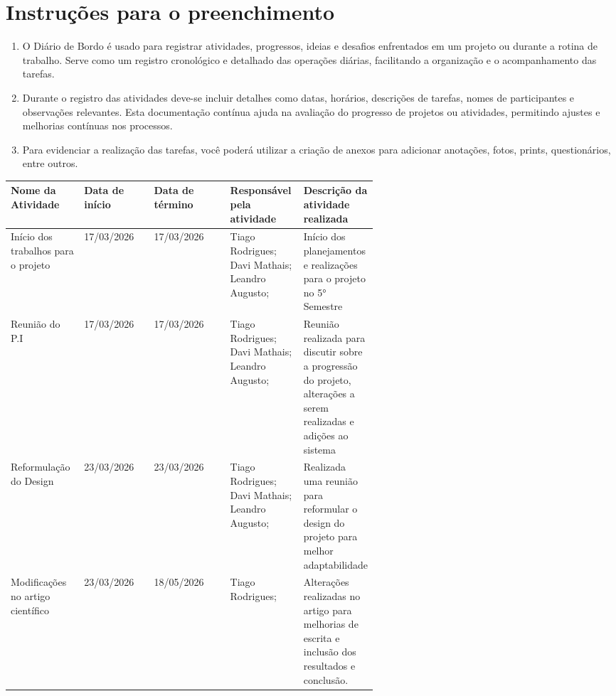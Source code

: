 \documentclass[
landscape,
  a4paper,
  12pt,
  english,
  brazilian,
]{article}
\begin{document}
\section*{Instruções para o preenchimento}
\doublespacing
\begin{enumerate}
    \item O Diário de Bordo é usado para registrar atividades, progressos, ideias e desafios enfrentados em um projeto ou durante a rotina de trabalho. Serve como um registro cronológico e detalhado das operações diárias, facilitando a organização e o acompanhamento das tarefas.
    \doublespacing
    \item Durante o registro das atividades deve-se incluir detalhes como datas, horários, descrições de tarefas, nomes de participantes e observações relevantes.  Esta documentação contínua ajuda na avaliação do progresso de projetos ou atividades, permitindo ajustes e melhorias contínuas nos processos.
    \doublespacing
    \item Para evidenciar a realização das tarefas, você poderá utilizar a criação de anexos para adicionar anotações, fotos, prints, questionários, entre outros.
\end{enumerate}

 \begin{table}[]
\centering
 

\begin{tabular}{|>{\raggedright\arraybackslash}p{0.2\linewidth}|l|l|>{\raggedright\arraybackslash}p{0.2\linewidth}|>{\raggedright\arraybackslash}p{0.2\linewidth}|}
\hline
Nome da Atividade & Data de início & Data de término & Responsável pela atividade & Descrição da atividade realizada \\\hline
                  Início dos trabalhos para o projeto&                            17/03/2026&                17/03/2026&                  Tiago Rodrigues; Davi Mathais; Leandro Augusto;&                                  Início dos planejamentos e realizações para o projeto no 5° Semestre\\ \hline
                  Reunião do P.I&                            17/03/2026&                17/03/2026&                 Tiago Rodrigues; Davi Mathais; Leandro Augusto;&                                 Reunião realizada para discutir sobre a progressão do projeto, alterações a serem realizadas e adições ao sistema \\ \hline 
 Reformulação do Design&                            23/03/2026&                 23/03/2026&                 Tiago Rodrigues; Davi Mathais; Leandro Augusto;&                                 Realizada uma reunião para reformular o design do projeto para melhor adaptabilidade\\ \hline
                  Modificações no artigo científico &                            23/03/2026&                18/05/2026&                 Tiago Rodrigues;&                                  Alterações realizadas no artigo para melhorias de escrita e inclusão dos resultados e conclusão.\\ \hline
                 
\end{tabular}


\end{table}
\end{document}

